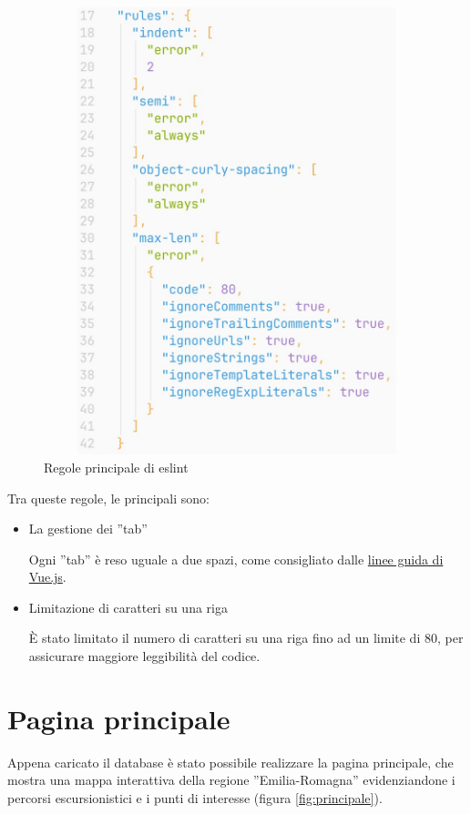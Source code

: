 \begin{figure}[h]
\begin{center}                      
\includegraphics[width=12cm, height=13cm]{images/eslint.jpg}
\caption[Regole principale di eslint]{Regole principale di eslint}\label{fig:eslint}
\end{center}
\end{figure}

Tra queste regole, le principali sono:

\begin{itemize}
    \item La gestione dei ”tab”

    Ogni ”tab” è reso uguale a due spazi, come consigliato dalle
    \href{https://eslint.vuejs.org/}{linee guida di Vue.js}.

    \item Limitazione di caratteri su una riga

    È stato limitato il numero di caratteri su una riga fino ad un limite di 80, per assicurare maggiore leggibilità del codice.
\end{itemize}



\section{Pagina principale}
Appena caricato il database è stato possibile realizzare la pagina principale, che mostra una mappa interattiva della regione ”Emilia-Romagna” evidenziandone i percorsi escursionistici e i punti di interesse (figura \ref{fig:principale}).

